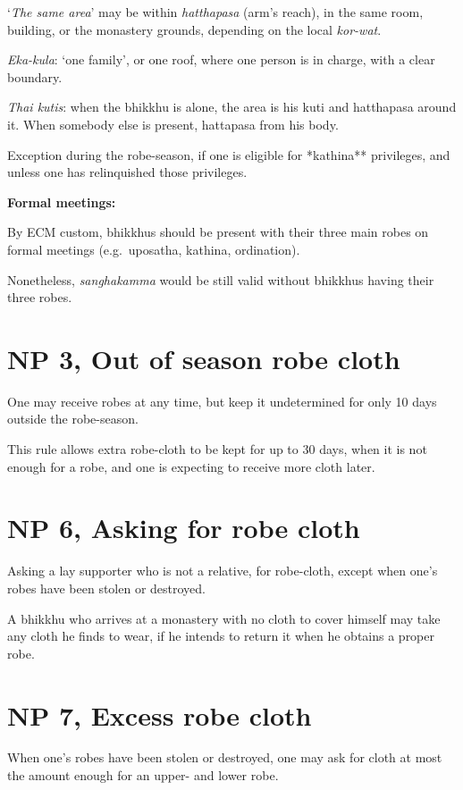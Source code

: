 `\emph{The same area}' may be within \emph{hatthapasa} (arm's reach), in
the same room, building, or the monastery grounds, depending on the
local \emph{kor-wat}.

\emph{Eka-kula}: `one family', or one roof, where one person is in
charge, with a clear boundary.

\emph{Thai kutis}: when the bhikkhu is alone, the area is his kuti and
hatthapasa around it. When somebody else is present, hattapasa from his
body.

Exception during the robe-season, if one is eligible for *kathina**
privileges, and unless one has relinquished those privileges.

\textbf{Formal meetings:}

By ECM custom, bhikkhus should be present with their three main robes on
formal meetings (e.g.~uposatha, kathina, ordination).

Nonetheless, \emph{sanghakamma} would be still valid without bhikkhus
having their three robes.

\section{NP 3, Out of season robe cloth}

One may receive robes at any time, but keep it undetermined for only 10
days outside the robe-season.

This rule allows extra robe-cloth to be kept for up to 30 days, when it
is not enough for a robe, and one is expecting to receive more cloth
later.

\section{NP 6, Asking for robe cloth}

Asking a lay supporter who is not a relative, for robe-cloth, except
when one's robes have been stolen or destroyed.

A bhikkhu who arrives at a monastery with no cloth to cover himself may
take any cloth he finds to wear, if he intends to return it when he
obtains a proper robe.

\section{NP 7, Excess robe cloth}

When one's robes have been stolen or destroyed, one may ask for cloth at
most the amount enough for an upper- and lower robe.

